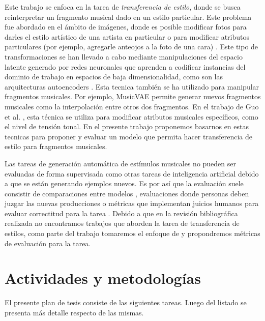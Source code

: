 \documentclass[10pt]{article}
\begin{document}
Este trabajo se enfoca en la tarea de \emph{transferencia de
estilo}, donde se busca reinterpretar un fragmento musical dado en un estilo
particular. Este problema fue abordado en el ámbito de imágenes, donde es
posible modificar fotos para darles el estilo artístico de una artista en
particular \cite{gatys2015style} o para modificar atributos particulares (por
ejemplo, agregarle anteojos a la foto de una cara) \cite{upchurch2016feature}.
Este tipo de transformaciones se han llevado a cabo mediante manipulaciones del
espacio latente generado por redes neuronales que aprenden a codificar
instancias del dominio de trabajo en espacios de baja dimensionalidad, como son
las arquitecturas autoencoders \cite{hou2016feature}. Esta tecnica también se
ha utilizado para manipular fragmentos musicales. Por ejemplo, MusicVAE
\cite{roberts2019musicvae} permite generar nuevos fragmentos musicales como la
interpolación entre otros dos fragmentos. En el trabajo de Guo et al.
\cite{guo2020variational}, esta técnica se utiliza para modificar atributos
musicales específicos, como el nivel de tensión tonal. En el presente trabajo
proponemos basarnos en estas tecnicas para proponer y evaluar un modelo que
permita hacer transferencia de estilo para fragmentos musicales.

Las tareas de generación automática de estímulos musicales no pueden ser
evaluadas de forma supervisada como otras tareas de inteligencia artificial
debido a que se están generando ejemplos nuevos. Es por así que la evaluación
suele consistir de comparaciones entre modelos \cite{Berardinis}, evaluaciones
donde personas deben juzgar las nuevas producciones \cite{hadjeres2017bach} o
métricas que implementan juicios humanos para evaluar correctitud para la
tarea \cite{benetatos2020bachduet}. Debido a que en la revisión bibliográfica 
realizada no encontramos trabajos que aborden la tarea de transferencia de
estilos, como parte del trabajo tomaremos el enfoque de
\cite{benetatos2020bachduet} y propondremos métricas de evaluación para la
tarea.

\section*{Actividades y metodologías}
El presente plan de tesis consiste de las siguientes tareas. Luego del listado
se presenta más detalle respecto de las mismas.
\end{document}
